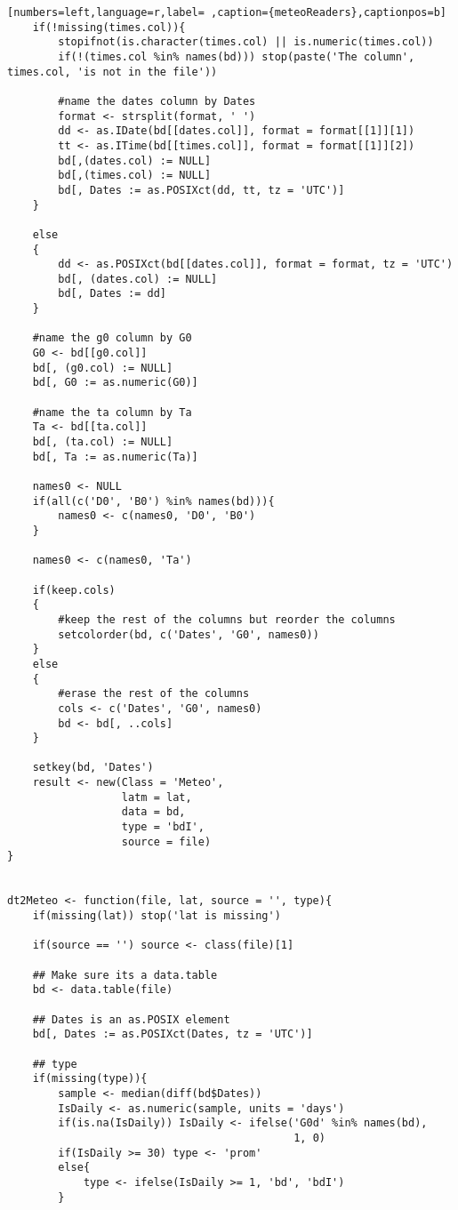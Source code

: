\begin{lstlisting}[numbers=left,language=r,label= ,caption={meteoReaders},captionpos=b]
    if(!missing(times.col)){
        stopifnot(is.character(times.col) || is.numeric(times.col))
        if(!(times.col %in% names(bd))) stop(paste('The column', times.col, 'is not in the file'))

        #name the dates column by Dates
        format <- strsplit(format, ' ')
        dd <- as.IDate(bd[[dates.col]], format = format[[1]][1])
        tt <- as.ITime(bd[[times.col]], format = format[[1]][2])
        bd[,(dates.col) := NULL]
        bd[,(times.col) := NULL]
        bd[, Dates := as.POSIXct(dd, tt, tz = 'UTC')]
    }

    else
    {
        dd <- as.POSIXct(bd[[dates.col]], format = format, tz = 'UTC')
        bd[, (dates.col) := NULL]
        bd[, Dates := dd]
    }

    #name the g0 column by G0
    G0 <- bd[[g0.col]]
    bd[, (g0.col) := NULL]
    bd[, G0 := as.numeric(G0)]

    #name the ta column by Ta
    Ta <- bd[[ta.col]]
    bd[, (ta.col) := NULL]
    bd[, Ta := as.numeric(Ta)]

    names0 <- NULL
    if(all(c('D0', 'B0') %in% names(bd))){
        names0 <- c(names0, 'D0', 'B0')
    }

    names0 <- c(names0, 'Ta')

    if(keep.cols)
    {
        #keep the rest of the columns but reorder the columns
        setcolorder(bd, c('Dates', 'G0', names0))
    }
    else
    {
        #erase the rest of the columns
        cols <- c('Dates', 'G0', names0)
        bd <- bd[, ..cols]
    }

    setkey(bd, 'Dates')
    result <- new(Class = 'Meteo',
                  latm = lat,
                  data = bd,
                  type = 'bdI',
                  source = file)
}


dt2Meteo <- function(file, lat, source = '', type){
    if(missing(lat)) stop('lat is missing')

    if(source == '') source <- class(file)[1]

    ## Make sure its a data.table
    bd <- data.table(file)

    ## Dates is an as.POSIX element
    bd[, Dates := as.POSIXct(Dates, tz = 'UTC')]

    ## type
    if(missing(type)){
        sample <- median(diff(bd$Dates))
        IsDaily <- as.numeric(sample, units = 'days')
        if(is.na(IsDaily)) IsDaily <- ifelse('G0d' %in% names(bd),
                                             1, 0)
        if(IsDaily >= 30) type <- 'prom'
        else{
            type <- ifelse(IsDaily >= 1, 'bd', 'bdI') 
        }


\end{lstlisting}
